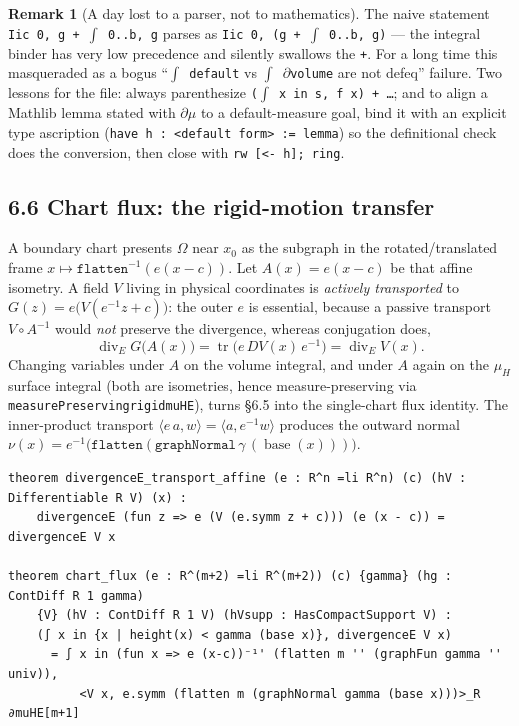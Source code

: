 ﻿\documentclass[12pt, a4paper]{article}
\renewcommand{\_}{\origunderscore\allowbreak}
\theoremstyle{definition}
\newtheorem{remark}{Remark}[section]
\theoremstyle{plain}
\begin{document}
\begin{remark}[A day lost to a parser, not to mathematics]
The naive statement \texttt{Iic 0, g + $\int$ 0..b, g} parses as \texttt{Iic 0, (g + $\int$ 0..b, g)}
--- the integral binder has very low precedence and silently swallows the \texttt{+}.  For a long
time this masqueraded as a bogus ``\texttt{$\int$ default} vs \texttt{$\int$ $\partial$volume} are
not defeq'' failure.  Two lessons for the file: always parenthesize
\texttt{($\int$ x in s, f x) + \dots}; and to align a Mathlib lemma stated with $\partial\mu$ to a
default-measure goal, bind it with an explicit type ascription (\texttt{have h : <default form> := lemma})
so the definitional check does the conversion, then close with \texttt{rw [<- h]; ring}.
\end{remark}

\subsection{6.6 Chart flux: the rigid-motion transfer}

A boundary chart presents $\Omega$ near $x_0$ as the subgraph in the rotated/translated frame
$x\mapsto\texttt{flatten}^{-1}(e(x-c))$.  Let $A(x)=e(x-c)$ be that affine isometry.  A field $V$
living in physical coordinates is \emph{actively transported} to $G(z)=e\big(V(e^{-1}z+c)\big)$: the
outer $e$ is essential, because a passive transport $V\circ A^{-1}$ would \emph{not} preserve the
divergence, whereas conjugation does,
\[
  \operatorname{div}_E G\big(A(x)\big)=\operatorname{tr}\!\big(e\,DV(x)\,e^{-1}\big)=\operatorname{div}_E V(x).
\]
Changing variables under $A$ on the volume integral, and under $A$ again on the $\mu_H$ surface
integral (both are isometries, hence measure-preserving via
\texttt{measurePreserving\_rigid\_muHE}), turns \S6.5 into the single-chart flux identity.  The
inner-product transport $\langle e\,a,w\rangle=\langle a,e^{-1}w\rangle$ produces the outward normal
$\nu(x)=e^{-1}\big(\texttt{flatten}(\texttt{graphNormal}\,\gamma\,(\operatorname{base}(x)))\big)$.

\begin{lstlisting}[caption={Divergence under an affine isometry, and chart flux}]
theorem divergenceE_transport_affine (e : R^n =li R^n) (c) (hV : Differentiable R V) (x) :
    divergenceE (fun z => e (V (e.symm z + c))) (e (x - c)) = divergenceE V x

theorem chart_flux (e : R^(m+2) =li R^(m+2)) (c) {gamma} (hg : ContDiff R 1 gamma)
    {V} (hV : ContDiff R 1 V) (hVsupp : HasCompactSupport V) :
    (∫ x in {x | height(x) < gamma (base x)}, divergenceE V x)
      = ∫ x in (fun x => e (x-c))⁻¹' (flatten m '' (graphFun gamma '' univ)),
          <V x, e.symm (flatten m (graphNormal gamma (base x)))>_R ∂muHE[m+1]
\end{lstlisting}
\end{document}
